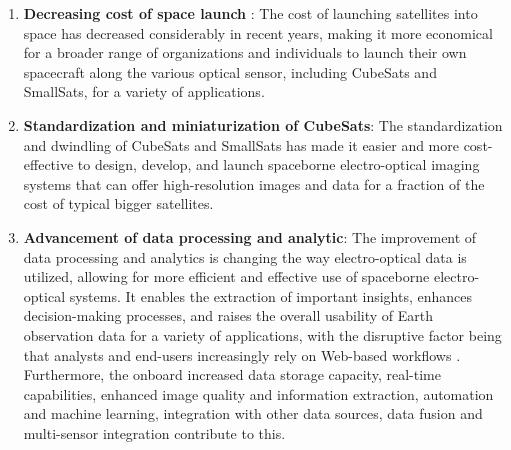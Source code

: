 \documentclass[final,5p,times,twocolumn,authoryear]{elsarticle}
\begin{document}
\begin{enumerate}
	\item \textbf{Decreasing cost of space launch }: The cost of launching satellites into space has decreased considerably in recent years, making it more economical for a broader range of organizations and individuals to launch their own spacecraft along the various optical sensor, including CubeSats and SmallSats, for a variety of applications.
	\item \textbf{Standardization and miniaturization of CubeSats}: The standardization and dwindling of CubeSats and SmallSats has made it easier and more cost-effective to design, develop, and launch spaceborne electro-optical imaging systems that can offer high-resolution images and data for a fraction of the cost of typical bigger satellites.
	\item \textbf{Advancement of data processing and analytic}: The improvement of data processing and analytics is changing the way electro-optical data is utilized, allowing for more efficient and effective use of spaceborne electro-optical systems. It enables the extraction of important insights, enhances decision-making processes, and raises the overall usability of Earth observation data for a variety of applications, with the disruptive factor being that analysts and end-users increasingly rely on Web-based workflows \citep{sudmanns2020big}.  Furthermore, the onboard increased data storage capacity, real-time capabilities, enhanced image quality and information extraction, automation and machine learning, integration with other data sources, data fusion and multi-sensor integration contribute to this.
\end{enumerate}
\end{document}
